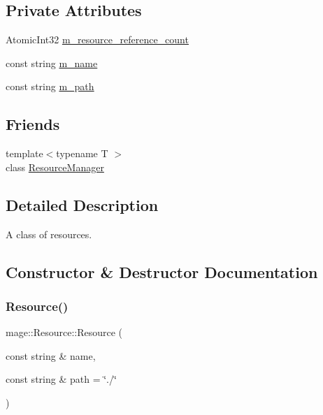 \subsection*{Private Attributes}
\begin{DoxyCompactItemize}
\item 
Atomic\+Int32 \hyperlink{classmage_1_1_resource_aa71f1ecac3436591032d2abd6a2f5c37}{m\+\_\+resource\+\_\+reference\+\_\+count}
\item 
const string \hyperlink{classmage_1_1_resource_a93019b74e9665195f1af17c60b6d171a}{m\+\_\+name}
\item 
const string \hyperlink{classmage_1_1_resource_a983470902250a8d16b6d5d01c332804b}{m\+\_\+path}
\end{DoxyCompactItemize}
\subsection*{Friends}
\begin{DoxyCompactItemize}
\item 
{\footnotesize template$<$typename T $>$ }\\class \hyperlink{classmage_1_1_resource_a51a7bf7c13d389aeee09c16059ca41c9}{Resource\+Manager}
\end{DoxyCompactItemize}


\subsection{Detailed Description}
A class of resources. 

\subsection{Constructor \& Destructor Documentation}
\hypertarget{classmage_1_1_resource_a7b4febc86646d51ac116732af01abcaf}{}\label{classmage_1_1_resource_a7b4febc86646d51ac116732af01abcaf} 
\subsubsection{\texorpdfstring{Resource()}{Resource()}}
{\footnotesize\ttfamily mage\+::\+Resource\+::\+Resource (\begin{DoxyParamCaption}\item[{const string \&}]{name,  }\item[{const string \&}]{path = {\ttfamily \char`\"{}./\char`\"{}} }\end{DoxyParamCaption})}

